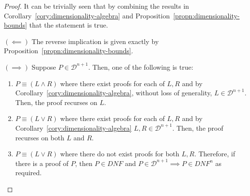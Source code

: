     \begin{proof}
        It can be trivially seen that by combining the results in Corollary~\ref{cory:dimensionality-algebra} and Proposition~\ref{propn:dimensionality-bounds} that the statement is true.
        
        $(\impliedby)$
        The reverse implication is given exactly by Proposition~\ref{propn:dimensionality-bounds}.

        $(\implies)$
        Suppose $P \in \mathcal{D}^{n+1}$.
        Then, one of the following is true:

        \begin{enumerate}
            \item
            $P \equiv (L \wedge R)$  where there exist proofs for each of $L, R$ and by Corollary~\ref{cory:dimensionality-algebra}, without loss of generality, $L \in \mathcal{D}^{n+1}$.
            Then, the proof recurses on $L$.

            \item
            $P \equiv (L \vee R)$ where there exist proofs for each of $L, R$ and by Corollary~\ref{cory:dimensionality-algebra} $L, R \in \mathcal{D}^{n+1}$.
            Then, the proof recurses on both $L$ and $R$.

            \item
            $P \equiv (L \vee R)$ where there do not exist proofs for both $L, R$.
            Therefore, if there is a proof of $P$, then $P \in \textit{DNF}$ and $P \in \mathcal{D}^{n+1} \implies P \in \textit{DNF}^n$ as required.
        \end{enumerate}
    \end{proof}
